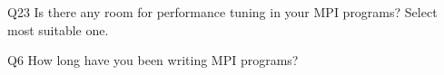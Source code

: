 \begin{description}%
\item{Q23} Is there any room for performance tuning in your MPI programs? Select most suitable one.%
\item{Q6} How long have you been writing MPI programs?%
\end{description}%
